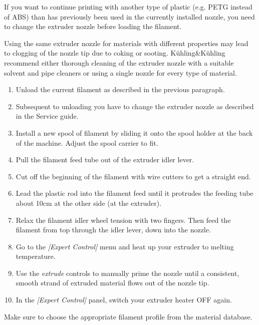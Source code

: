 If you want to continue printing with another type of plastic (e.g. PETG instead of ABS) than has previously been used in the currently installed nozzle, you need to change the extruder nozzle before loading the filament.

\begin{info}
  Using the same extruder nozzle for materials with different properties may lead to clogging of the nozzle tip due to coking or sooting.
  Kühling\&Kühling recommend either thorough cleaning of the extruder nozzle with a suitable solvent and pipe cleaners or using a single nozzle for every type of material.
\end{info}

\begin{enumerate}
  \item Unload the current filament as described in the previous paragraph.
  \item Subsequent to unloading you have to change the extruder nozzle as 
        described in the Service guide.
  \item Install a new spool of filament by sliding it onto the spool holder at the back of
        the machine. Adjust the spool carrier to fit.
  \item Pull the filament feed tube out of the extruder idler lever.
  \item Cut off the beginning of the filament with wire cutters to get a
        straight end.
  \item Lead the plastic rod into the filament feed until it protrudes the feeding tube
        about 10cm at the other side (at the extruder).
  \item Relax the filament idler wheel tension with two fingers.
        Then feed the filament from top through the idler lever,
        down into the nozzle.
  \item Go to the \emph{[Expert Control]} menu and heat up your extruder to melting temperature.
  \item Use the \emph{extrude} controls to manually prime the nozzle until a consistent, smooth strand of extruded material
        flows out of the nozzle tip.
  \item In the \emph{[Expert Control]} panel, switch your extruder heater OFF again.
\end{enumerate}

\begin{info}
  Make sure to choose the appropriate filament profile from the material database.
\end{info}


